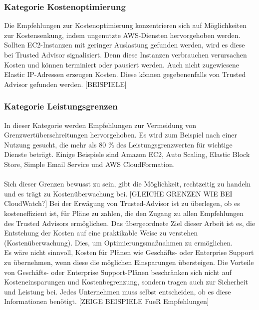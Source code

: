 \subsubsection*{Kategorie Kostenoptimierung}
Die Empfehlungen zur Kostenoptimierung konzentrieren sich auf Möglichkeiten zur Kostensenkung, indem ungenutzte AWS-Diensten hervorgehoben werden. 
Sollten EC2-Instanzen mit geringer Auslastung gefunden werden, wird es diese bei Trusted Advisor signalisiert. Denn diese Instanzen verbrauchen verursachen Kosten und können terminiert oder pausiert werden. %
Auch nicht zugewiesene Elastic IP-Adressen erzeugen Kosten. Diese können gegebenenfalls von Trusted Advisor gefunden werden. %
[BEISPIELE]

\subsubsection*{Kategorie Leistungsgrenzen}
In dieser Kategorie werden Empfehlungen zur Vermeidung von Grenzwertüberschreitungen hervorgehoben.
Es wird zum Beispiel nach einer Nutzung gesucht, die mehr als 80 \% des Leistungsgrenzwerten für wichtige Dienste beträgt. Einige Beispiele sind  Amazon EC2, Auto Scaling, Elastic Block Store, Simple Email Service und AWS CloudFormation.
\\\\
Sich dieser Grenzen bewusst zu sein, gibt die Möglichkeit, rechtzeitig zu handeln und es trägt zu Kostenüberwachung bei.
[GLEICHE GRENZEN WIE BEI CloudWatch?]
Bei der Erwägung von Trusted-Advisor ist zu überlegen, ob es kosteneffizient ist, für Pläne zu zahlen, die den Zugang zu allen Empfehlungen des Trusted Advisors ermöglichen. Das übergeordnete Ziel dieser Arbeit ist es, die Entstehung der Kosten auf eine praktikable Weise zu verstehen (Kostenüberwachung). Dies, um Optimierungsmaßnahmen zu ermöglichen. 
\\
Es wäre nicht sinnvoll, Kosten für Plänen wie Geschäfts- oder Enterprise Support zu übernehmen, wenn diese die möglichen Einsparungen übersteigen.  Die Vorteile von Geschäfts- oder Enterprise Support-Plänen beschränken sich nicht auf Kosteneinsparungen und Kostenbegrenzung, sondern tragen auch zur Sicherheit und Leistung bei. Jedes Unternehmen muss selbst entscheiden, ob es diese Informationen benötigt.
[ZEIGE BEISPIELE FueR Empfehlungen]\\
\\
